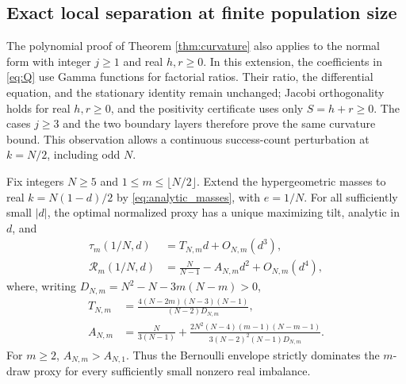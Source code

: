 \subsection{Exact local separation at finite population size}
The polynomial proof of Theorem \ref{thm:curvature} also applies to the normal form with integer $j\ge1$ and real $h,r\ge0$. In this extension, the coefficients in \eqref{eq:Q} use Gamma functions for factorial ratios. Their ratio, the differential equation, and the stationary identity remain unchanged; Jacobi orthogonality holds for real $h,r\ge0$, and the positivity certificate uses only $S=h+r\ge0$. The cases $j\ge3$ and the two boundary layers therefore prove the same curvature bound. This observation allows a continuous success-count perturbation at $k=N/2$, including odd $N$.

\begin{theorem}\label{thm:exact_imbalance}
Fix integers $N\ge5$ and $1\le m\le\lfloor N/2\rfloor$. Extend the hypergeometric masses to real $k=N(1-d)/2$ by \eqref{eq:analytic_masses}, with $e=1/N$. For all sufficiently small $|d|$, the optimal normalized proxy has a unique maximizing tilt, analytic in $d$, and
\begin{align}
 \tau_m(1/N,d)&=T_{N,m}d+O_{N,m}(d^3),\label{eq:finite_tilt}\\
 \mathcal R_m(1/N,d)&=\frac N{N-1}-A_{N,m}d^2+O_{N,m}(d^4),\label{eq:finite_imbalance}
\end{align}
where, writing $D_{N,m}=N^2-N-3m(N-m)>0$,
\begin{align}
 T_{N,m}&=\frac{4(N-2m)(N-3)(N-1)}{(N-2)D_{N,m}},\label{eq:finite_T}\\
 A_{N,m}&=\frac N{3(N-1)}+
 \frac{2N^2(N-4)(m-1)(N-m-1)}
 {3(N-2)^2(N-1)D_{N,m}}.\label{eq:finite_A}
\end{align}
For $m\ge2$, $A_{N,m}>A_{N,1}$. Thus the Bernoulli envelope strictly dominates the $m$-draw proxy for every sufficiently small nonzero real imbalance.
\end{theorem}
